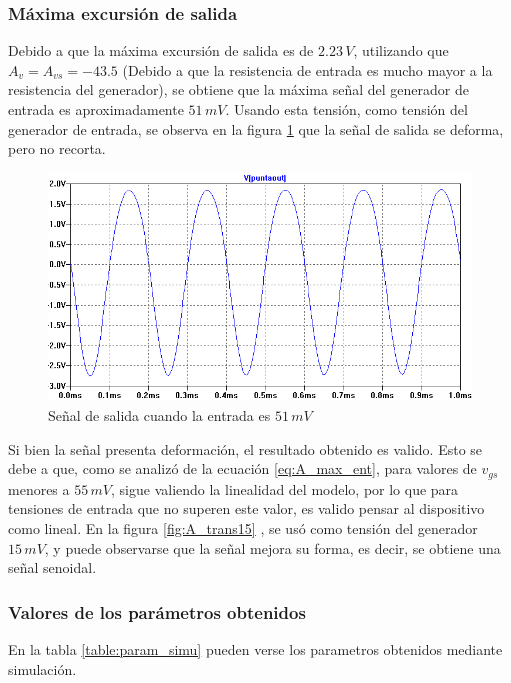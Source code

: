 \documentclass[10pt,spanish,a4paper,notitlepage]{article}
\begin{document}
\subsubsection{Máxima excursión de salida}
Debido a que la máxima excursión de salida es de $2.23\,\unit{V}$, utilizando que $A_v=A_{vs}=-43.5$ (Debido a que la resistencia de entrada es mucho mayor a la resistencia del generador), se obtiene que la máxima señal del generador de entrada es aproximadamente $51\,\unit{mV}$. Usando esta tensión, como tensión del generador de entrada, se observa  en la figura \ref{fig:A_trans} que la señal de salida se deforma, pero no recorta.

\begin{figure}[H]
\centering
\includegraphics[scale=0.7]{simulaciones/A_trans.png}
\caption{Señal de salida cuando la entrada es $51\,\unit{mV}$ }
\label{fig:A_trans}
\end{figure}

Si bien la señal presenta deformación, el resultado obtenido es valido. Esto se debe a que, como se analizó de la ecuación \ref{eq:A_max_ent}, para valores de $v_{gs}$ menores a $55\,\unit{mV}$, sigue valiendo la linealidad del modelo, por lo que para tensiones de entrada que no superen este valor, es valido pensar al dispositivo como lineal. En la figura \ref{fig:A_trans15} , se usó como tensión del generador $15\,\unit{mV}$, y puede observarse que la señal mejora su forma, es decir, se obtiene una señal senoidal. 

\subsubsection{Valores de los parámetros obtenidos}
En la tabla \ref{table:param_simu} pueden verse los parametros obtenidos mediante simulación.
\end{document}
